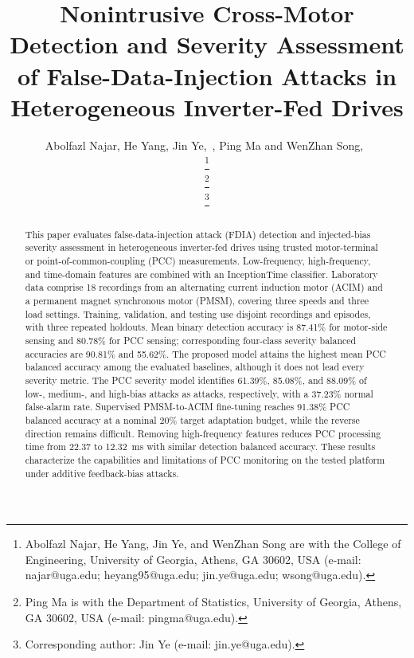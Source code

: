 \documentclass[letterpaper,journal]{IEEEtran}
\begin{document}
\title{Nonintrusive Cross-Motor Detection and Severity Assessment of False-Data-Injection Attacks in Heterogeneous Inverter-Fed Drives
}

\author{%
    Abolfazl Najar, He Yang, Jin Ye,~,  Ping Ma and WenZhan Song,~%

    \thanks{Abolfazl Najar, He Yang, Jin Ye, and WenZhan Song are with the College of Engineering, University of Georgia, Athens, GA 30602, USA (e-mail: najar@uga.edu; heyang95@uga.edu; jin.ye@uga.edu; wsong@uga.edu).}%
    
    \thanks{Ping Ma is with the Department of Statistics, University of Georgia, Athens, GA 30602, USA (e-mail: pingma@uga.edu).}%
    
    \thanks{Corresponding author: Jin Ye (e-mail: jin.ye@uga.edu).}%
    
}

\maketitle

\begin{abstract}
This paper evaluates false-data-injection attack (FDIA) detection and injected-bias severity assessment in heterogeneous inverter-fed drives using trusted motor-terminal or point-of-common-coupling (PCC) measurements. Low-frequency, high-frequency, and time-domain features are combined with an InceptionTime classifier. Laboratory data comprise 18 recordings from an alternating current induction motor (ACIM) and a permanent magnet synchronous motor (PMSM), covering three speeds and three load settings. Training, validation, and testing use disjoint recordings and episodes, with three repeated holdouts. Mean binary detection accuracy is 87.41\% for motor-side sensing and 80.78\% for PCC sensing; corresponding four-class severity balanced accuracies are 90.81\% and 55.62\%. The proposed model attains the highest mean PCC balanced accuracy among the evaluated baselines, although it does not lead every severity metric. The PCC severity model identifies 61.39\%, 85.08\%, and 88.09\% of low-, medium-, and high-bias attacks as attacks, respectively, with a 37.23\% normal false-alarm rate. Supervised PMSM-to-ACIM fine-tuning reaches 91.38\% PCC balanced accuracy at a nominal 20\% target adaptation budget, while the reverse direction remains difficult. Removing high-frequency features reduces PCC processing time from 22.37 to 12.32~ms with similar detection balanced accuracy. These results characterize the capabilities and limitations of PCC monitoring on the tested platform under additive feedback-bias attacks.
\end{abstract}
\end{document}
